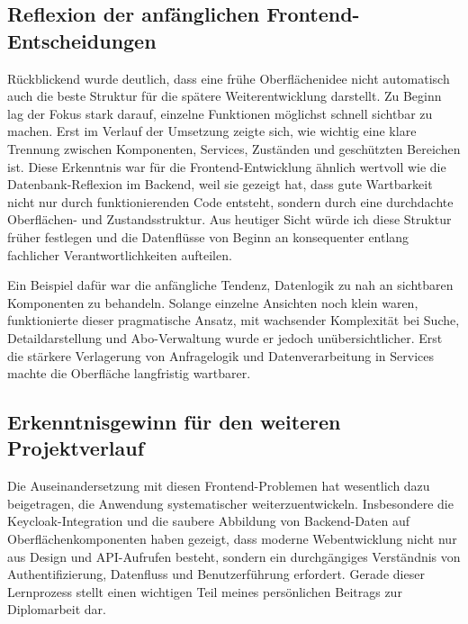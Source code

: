 \subsection{Reflexion der anfänglichen Frontend-Entscheidungen}
Rückblickend wurde deutlich, dass eine frühe Oberflächenidee nicht automatisch auch die beste Struktur für die spätere Weiterentwicklung darstellt. Zu Beginn lag der Fokus stark darauf, einzelne Funktionen möglichst schnell sichtbar zu machen. Erst im Verlauf der Umsetzung zeigte sich, wie wichtig eine klare Trennung zwischen Komponenten, Services, Zuständen und geschützten Bereichen ist. Diese Erkenntnis war für die Frontend-Entwicklung ähnlich wertvoll wie die Datenbank-Reflexion im Backend, weil sie gezeigt hat, dass gute Wartbarkeit nicht nur durch funktionierenden Code entsteht, sondern durch eine durchdachte Oberflächen- und Zustandsstruktur. Aus heutiger Sicht würde ich diese Struktur früher festlegen und die Datenflüsse von Beginn an konsequenter entlang fachlicher Verantwortlichkeiten aufteilen.

Ein Beispiel dafür war die anfängliche Tendenz, Datenlogik zu nah an sichtbaren Komponenten zu behandeln. Solange einzelne Ansichten noch klein waren, funktionierte dieser pragmatische Ansatz, mit wachsender Komplexität bei Suche, Detaildarstellung und Abo-Verwaltung wurde er jedoch unübersichtlicher. Erst die stärkere Verlagerung von Anfragelogik und Datenverarbeitung in Services machte die Oberfläche langfristig wartbarer.

\subsection{Erkenntnisgewinn für den weiteren Projektverlauf}
Die Auseinandersetzung mit diesen Frontend-Problemen hat wesentlich dazu beigetragen, die Anwendung systematischer weiterzuentwickeln. Insbesondere die Keycloak-Integration und die saubere Abbildung von Backend-Daten auf Oberflächenkomponenten haben gezeigt, dass moderne Webentwicklung nicht nur aus Design und API-Aufrufen besteht, sondern ein durchgängiges Verständnis von Authentifizierung, Datenfluss und Benutzerführung erfordert. Gerade dieser Lernprozess stellt einen wichtigen Teil meines persönlichen Beitrags zur Diplomarbeit dar.
